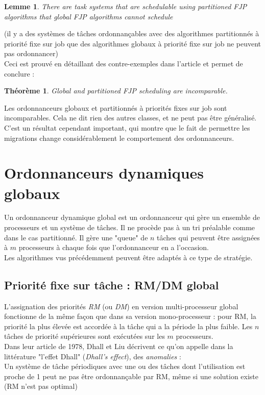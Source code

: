 \documentclass[11pt,a4paper,oneside]{report}
\newtheorem{mytheorem}{Théorème}
\newtheorem{mylemme}{Lemme}
\begin{document}
\begin{mylemme}
	There are task systems that are schedulable using partitioned FJP algorithms that global FJP algorithms cannot schedule
\end{mylemme}
(il y a des systèmes de tâches ordonnançables avec des algorithmes partitionnés à priorité fixe 
	sur job que des algorithmes globaux à priorité fixe sur job ne peuvent pas ordonnancer)\\
Ceci est prouvé en détaillant des contre-exemples dans l'article et permet de conclure :\\
\begin{mytheorem}
	Global and partitioned FJP scheduling are incomparable.
\end{mytheorem}
Les ordonnanceurs globaux et partitionnés à priorités fixes sur job sont incomparables. 
Cela ne dit rien des autres classes, et ne peut pas être généralisé. C'est 
un résultat cependant important, qui montre que le fait de permettre les migrations 
change considérablement le comportement des ordonnanceurs.

\section{Ordonnanceurs dynamiques globaux}
Un ordonnanceur dynamique global est un ordonnanceur qui gère un ensemble de processeurs et 
un système de tâches. Il ne procède pas à un tri préalable comme dans le cas partitionné. 
Il gère une "queue" de $n$ tâches qui peuvent être assignées à $m$ processeurs à chaque fois 
que l'ordonnanceur en a l'occasion.\\

Les algorithmes vus précédemment peuvent être adaptés à ce type de stratégie. 

\subsection{Priorité fixe sur tâche : RM/DM global}
L'assignation des priorités \textit{RM} (ou \textit{DM}) en version multi-processeur global 
fonctionne de la même façon que dans sa version mono-processeur : 
pour RM, la priorité la plus élevée est accordée à la tâche qui a la période la plus faible. 
Les $n$ tâches de priorité supérieures sont exécutées sur les $m$ processeurs. \\

Dans leur article de 1978, Dhall et Liu décrivent ce qu'on appelle dans la littérature 
"l'effet Dhall" (\textit{Dhall's effect}), des \textit{anomalies} : \cite{dhall_real-time_1978}\\
Un système de tâche périodiques avec une ou des tâches dont l'utilisation est proche de 1 
peut ne pas être ordonnançable par RM, même si une solution existe (RM n'est pas optimal)
\end{document}
